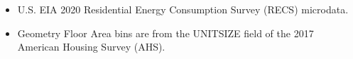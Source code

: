 \begin{itemize}
\item U.S. EIA 2020 Residential Energy Consumption Survey (RECS) microdata.
\item Geometry Floor Area bins are from the UNITSIZE field of the 2017 American Housing Survey (AHS).
\end{itemize}
